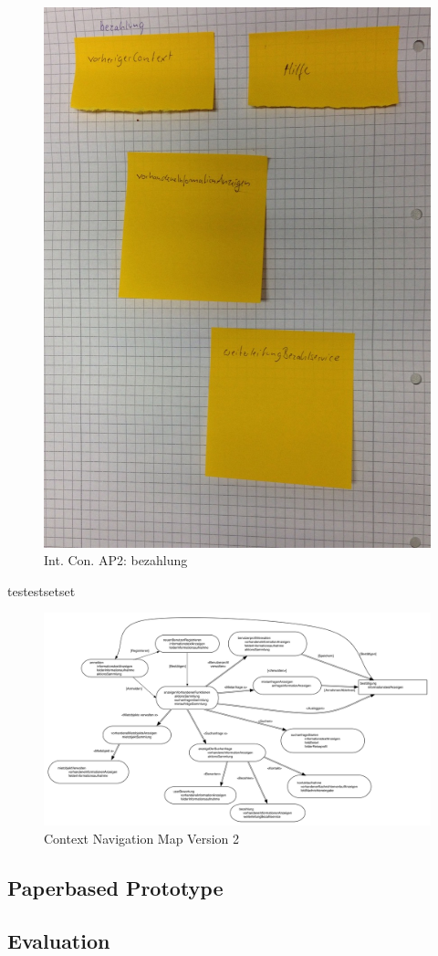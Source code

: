 \begin{figure}
\centering
\includegraphics[width=.5\textwidth]{./images/abstract/version2/bezahlung.JPG}
\caption{Int. Con. AP2: bezahlung}
\label{interfaceContents13}
\end{figure}


testestsetset

\begin{figure}[H]
\includegraphics[width=1\textwidth]{./images/navigationmap2.png}
\caption{Context Navigation Map Version 2}
\label{fig:navigationmap2}
\end{figure}


\newpage
\subsection{Paperbased Prototype}
\subsection{Evaluation}
